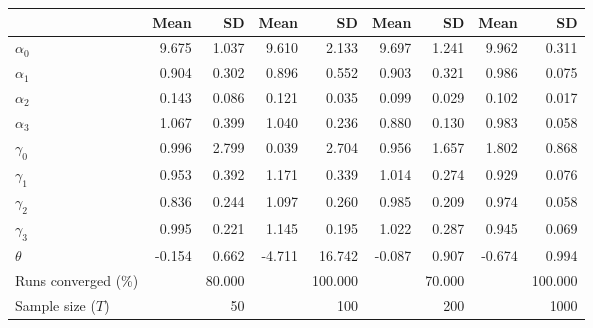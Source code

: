 
\begin{tabular}[t]{lrrrrrrrr}
\toprule
  & Mean & SD & Mean  & SD  & Mean   & SD   & Mean    & SD   \\
\midrule
$\alpha_{0}$ & 9.675 & 1.037 & 9.610 & 2.133 & 9.697 & 1.241 & 9.962 & 0.311\\
$\alpha_{1}$ & 0.904 & 0.302 & 0.896 & 0.552 & 0.903 & 0.321 & 0.986 & 0.075\\
$\alpha_{2}$ & 0.143 & 0.086 & 0.121 & 0.035 & 0.099 & 0.029 & 0.102 & 0.017\\
$\alpha_{3}$ & 1.067 & 0.399 & 1.040 & 0.236 & 0.880 & 0.130 & 0.983 & 0.058\\
$\gamma_{0}$ & 0.996 & 2.799 & 0.039 & 2.704 & 0.956 & 1.657 & 1.802 & 0.868\\
$\gamma_{1}$ & 0.953 & 0.392 & 1.171 & 0.339 & 1.014 & 0.274 & 0.929 & 0.076\\
$\gamma_{2}$ & 0.836 & 0.244 & 1.097 & 0.260 & 0.985 & 0.209 & 0.974 & 0.058\\
$\gamma_{3}$ & 0.995 & 0.221 & 1.145 & 0.195 & 1.022 & 0.287 & 0.945 & 0.069\\
$\theta$ & -0.154 & 0.662 & -4.711 & 16.742 & -0.087 & 0.907 & -0.674 & 0.994\\
Runs converged (\%) &  & 80.000 &  & 100.000 &  & 70.000 &  & 100.000\\
Sample size ($T$) &  & 50 &  & 100 &  & 200 &  & 1000\\
\bottomrule
\end{tabular}
